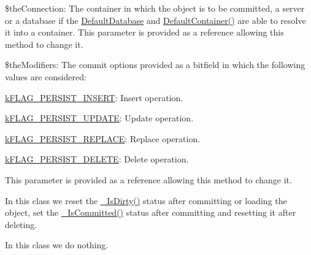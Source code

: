 \begin{DoxyItemize}
\item {\ttfamily \$the\-Connection}\-: The container in which the object is to be committed, a server or a database if the \hyperlink{class_c_persistent_document_a6092e640e36485873b70a79db464e0ff}{Default\-Database} and \hyperlink{class_c_persistent_document_ada019252d242b5a88a26b82a18e29ed6}{Default\-Container()} are able to resolve it into a container. This parameter is provided as a reference allowing this method to change it. 
\item {\ttfamily \$the\-Modifiers}\-: The commit options provided as a bitfield in which the following values are considered\-: 
\begin{DoxyItemize}
\item {\ttfamily \hyperlink{}{k\-F\-L\-A\-G\-\_\-\-P\-E\-R\-S\-I\-S\-T\-\_\-\-I\-N\-S\-E\-R\-T}}\-: Insert operation. 
\item {\ttfamily \hyperlink{}{k\-F\-L\-A\-G\-\_\-\-P\-E\-R\-S\-I\-S\-T\-\_\-\-U\-P\-D\-A\-T\-E}}\-: Update operation. 
\item {\ttfamily \hyperlink{}{k\-F\-L\-A\-G\-\_\-\-P\-E\-R\-S\-I\-S\-T\-\_\-\-R\-E\-P\-L\-A\-C\-E}}\-: Replace operation. 
\item {\ttfamily \hyperlink{}{k\-F\-L\-A\-G\-\_\-\-P\-E\-R\-S\-I\-S\-T\-\_\-\-D\-E\-L\-E\-T\-E}}\-: Delete operation. 
\end{DoxyItemize}This parameter is provided as a reference allowing this method to change it. 
\end{DoxyItemize}

In this class we reset the \hyperlink{class_c_status_document_ad5193995e1bff6de09acf3248a232ef9}{\-\_\-\-Is\-Dirty()} status after committing or loading the object, set the \hyperlink{class_c_status_document_ab7d96fd4588cf7d5432fc65a1d1fb076}{\-\_\-\-Is\-Committed()} status after committing and resetting it after deleting.

In this class we do nothing.


